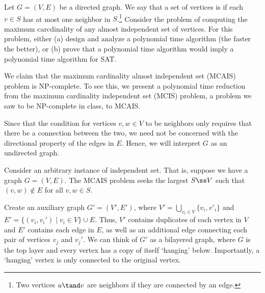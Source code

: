 \documentclass{article}
\begin{document}
\setcounter{section}{13}
\setcounter{exercise}{3}
\begin{exercise}
Let \( G=(V,E) \) be a directed graph.
We say that a set of vertices is  if each \( v\in S \) has at most one neighbor in \( S \).\footnote[5]{Two vertices \( u \tand v \) are neighbors if they are connected by an edge.}
Consider the problem of computing the maximum carcdinality of any almost independent set of vertices.
For this problem, either (a) design and analyze a polynomial time algorithm (the faster the better), or (b) prove that a polynomial time algorithm would imply a polynomial time algorithm for SAT.
\end{exercise}

\begin{solution}
  We claim that the maximum cardinality almost independent set (MCAIS) problem is NP-complete.
  To see this, we present a polynomial time reduction from the maximum cardinality independent set (MCIS) problem, a problem we saw to be NP-complete in class, to MCAIS.

  \begin{note}
    Since that the condition for vertices \( v,w\in V \) to be neighbors only requires that there be a connection between the two, we need not be concerned with the directional property of the edges in \( E \).
    Hence, we will interpret \( G \) as an undirected graph.
  \end{note}

  Consider an arbitrary instance of independent set.
  That is, suppose we have a graph \( G=(V,E) \).
  The MCAIS problem seeks the largest \( S\ss V \) such that \( (v,w)\not\in E \) for all \( v,w\in S \).

  Create an auxiliary graph \( G'=(V',E') \), where \( V'=\bigcup\limits_{v_i\in V}\{v_i,v'_i\} \) and \( E'=\{(v_i,v_i')\mid v_i\in V\}\cup E \).
  Thus, \( V' \) contains duplicates of each vertex in \( V \) and \( E' \) contains each edge in \( E \), as well as an additional edge connecting each pair of vertices \( v_j \) and \( v_j' \).
  We can think of \( G' \) as a bilayered graph, where \( G \) is the top layer and every vertex has a copy of itself `hanging' below.
  Importantly, a `hanging' vertex is only connected to the original vertex.


\end{solution}
\end{document}
